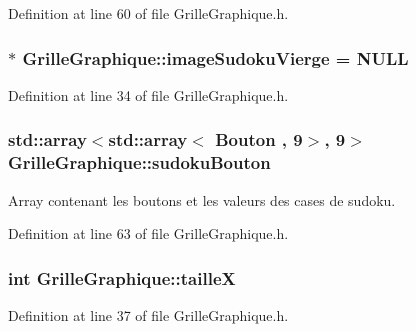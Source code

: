 Definition at line 60 of file Grille\+Graphique.\+h.

\hypertarget{class_grille_graphique_aac3927bfac4f3677b01e5ebf30fb4280}{}
\subsubsection[{image\+Sudoku\+Vierge}]{$\ast$ Grille\+Graphique\+::image\+Sudoku\+Vierge = {\bf N\+U\+L\+L}}\label{class_grille_graphique_aac3927bfac4f3677b01e5ebf30fb4280}


Definition at line 34 of file Grille\+Graphique.\+h.

\hypertarget{class_grille_graphique_a19ac32327d22811a2e2cdbaf93286b06}{}
\subsubsection[{sudoku\+Bouton}]{\setlength{\rightskip}{0pt plus 5cm}std\+::array$<$std\+::array$<$ {\bf Bouton} , 9$>$, 9$>$ Grille\+Graphique\+::sudoku\+Bouton}\label{class_grille_graphique_a19ac32327d22811a2e2cdbaf93286b06}


Array contenant les boutons et les valeurs des cases de sudoku. 



Definition at line 63 of file Grille\+Graphique.\+h.

\hypertarget{class_grille_graphique_a405f912724d23fe62af6002de6786650}{}
\subsubsection[{taille\+X}]{\setlength{\rightskip}{0pt plus 5cm}int Grille\+Graphique\+::taille\+X}\label{class_grille_graphique_a405f912724d23fe62af6002de6786650}


Definition at line 37 of file Grille\+Graphique.\+h.

\hypertarget{class_grille_graphique_a02037911fa5a2a342b3f90a15ad8d493}{}
